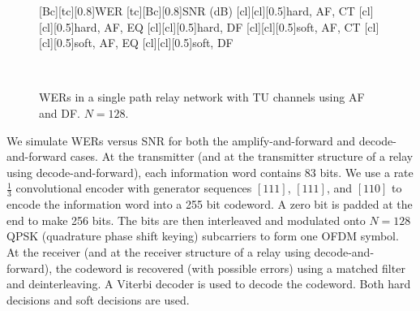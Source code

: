 \documentclass[journal]{IEEEtran}
\begin{document}
\begin{figure}
    [Bc][tc][0.8]{WER}
    [tc][Bc][0.8]{SNR (dB)}
    [cl][cl][0.5]{hard, AF, CT}
    [cl][cl][0.5]{hard, AF, EQ}
    [cl][cl][0.5]{hard, DF}
    [cl][cl][0.5]{soft, AF, CT}
    [cl][cl][0.5]{soft, AF, EQ}
    [cl][cl][0.5]{soft, DF}

\centerline{
     \\
}
 \caption{WERs in a single path relay network
with TU channels using AF and DF.  $N = 128$.}
\label{fig:plots_sp}
\end{figure}

We simulate WERs versus SNR for both the amplify-and-forward and decode-and-forward cases.  At the transmitter (and at the transmitter structure of a relay using decode-and-forward), each information word contains 83 bits.  We use a rate $\frac{1}{3}$ convolutional encoder with generator sequences $\left[1 1 1\right]$, $\left[1 1 1\right]$, and $\left[1 1 0\right]$ to encode the information word into a 255 bit codeword.  A zero bit is padded at the end to make 256 bits.  The bits are then interleaved and modulated onto $N = 128$ QPSK (quadrature phase shift keying) subcarriers to form one OFDM symbol.  At the receiver (and at the receiver structure of a relay using decode-and-forward), the codeword is recovered (with possible errors) using a matched filter and deinterleaving.  A Viterbi decoder is used to decode the codeword.  Both hard decisions and soft decisions are used.
\end{document}
